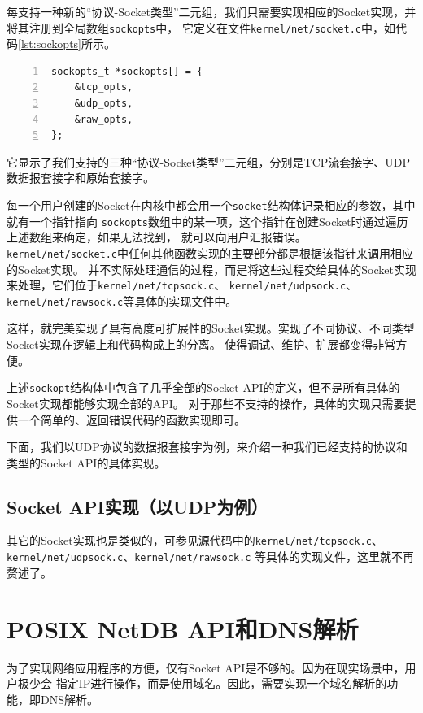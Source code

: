 \documentclass[a4paper,twoside]{ctexrep}
\begin{document}
\begin{spacing}{1.2}
每支持一种新的“协议-Socket类型”二元组，我们只需要实现相应的Socket实现，并将其注册到全局数组\texttt{sockopts}中，
它定义在文件\texttt{kernel/net/socket.c}中，如代码\ref{lst:sockopts}所示。
\begin{lstlisting}[numbers=left,style=CppStyle,caption=sockopts数组,label={code:sockopts}]
sockopts_t *sockopts[] = {
	&tcp_opts,
	&udp_opts,
	&raw_opts,
};
\end{lstlisting}
它显示了我们支持的三种“协议-Socket类型”二元组，分别是TCP流套接字、UDP数据报套接字和原始套接字。

每一个用户创建的Socket在内核中都会用一个\texttt{socket}结构体记录相应的参数，其中就有一个指针指向
\texttt{sockopts}数组中的某一项，这个指针在创建Socket时通过遍历上述数组来确定，如果无法找到，
就可以向用户汇报错误。\texttt{kernel/net/socket.c}中任何其他函数实现的主要部分都是根据该指针来调用相应的Socket实现。
并不实际处理通信的过程，而是将这些过程交给具体的Socket实现来处理，它们位于\texttt{kernel/net/tcpsock.c}、
\texttt{kernel/net/udpsock.c}、\texttt{kernel/net/rawsock.c}等具体的实现文件中。

这样，就完美实现了具有高度可扩展性的Socket实现。实现了不同协议、不同类型Socket实现在逻辑上和代码构成上的分离。
使得调试、维护、扩展都变得非常方便。

上述\texttt{sockopt}结构体中包含了几乎全部的Socket API的定义，但不是所有具体的Socket实现都能够实现全部的API。
对于那些不支持的操作，具体的实现只需要提供一个简单的、返回错误代码的函数实现即可。

下面，我们以UDP协议的数据报套接字为例，来介绍一种我们已经支持的协议和类型的Socket API的具体实现。

\subsection{Socket API实现（以UDP为例）}




其它的Socket实现也是类似的，可参见源代码中的\texttt{kernel/net/tcpsock.c}、
\texttt{kernel/net/udpsock.c}、\texttt{kernel/net/rawsock.c}
等具体的实现文件，这里就不再赘述了。

\section{POSIX NetDB API和DNS解析}

为了实现网络应用程序的方便，仅有Socket API是不够的。因为在现实场景中，用户极少会
指定IP进行操作，而是使用域名。因此，需要实现一个域名解析的功能，即DNS解析。


\end{spacing}
\end{document}
